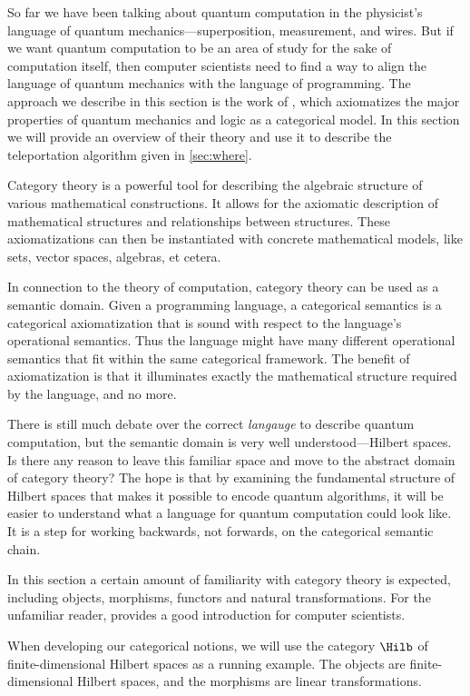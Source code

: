 So far we have been talking about quantum computation in the physicist's language
of quantum mechanics---superposition, measurement, and wires. 
But if we want quantum computation to be an area of study for the sake of
computation itself, then computer scientists need to find a way to align
the language of quantum mechanics with the language of programming.
The approach we describe in this section is the work of \citet{abramsky2009categorical},
which axiomatizes the major properties of quantum mechanics and logic as a categorical model.
In this section we will provide an overview of their theory and use it to describe the
teleportation algorithm given in \cref{sec:where}.

Category theory is a powerful tool for describing the algebraic structure of
various mathematical constructions. It allows for the axiomatic description
of mathematical structures and relationships between structures. These axiomatizations
can then be instantiated with concrete mathematical models, like sets,
vector spaces, algebras, et cetera. 

In connection to the theory of computation, category theory can be used as a semantic
domain. Given a programming language, a categorical semantics is a categorical axiomatization
that is sound with respect to the language's operational semantics. 
Thus the language might have many different operational semantics that fit within the same
categorical framework. 
The benefit of axiomatization is that it illuminates exactly the mathematical structure
required by the language, and no more.

There is still much debate over the correct \emph{langauge} to describe quantum computation,
but the semantic domain is very well understood---Hilbert spaces.
Is there any reason to leave this familiar space and move to the abstract domain of category theory?
The hope is that by examining the fundamental structure of Hilbert spaces that makes it possible
to encode quantum algorithms, it will be easier to understand what a language for
quantum computation could look like. It is a step for working backwards, not forwards,
on the categorical semantic chain.

In this section a certain amount of familiarity with category theory is expected,
including objects, morphisms, functors and natural transformations. 
For the unfamiliar reader, \citet{pierce1991basic} provides a good introduction for
computer scientists.

When developing our categorical notions, we will use the category $\Hilb$ of finite-dimensional
Hilbert spaces as a running example. The objects are finite-dimensional Hilbert spaces,
and the morphisms are linear transformations. 

